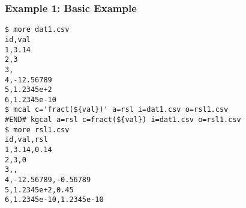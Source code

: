 \subsubsection*{Example 1: Basic Example}



\begin{Verbatim}[baselinestretch=0.7,frame=single]
$ more dat1.csv
id,val
1,3.14
2,3
3,
4,-12.56789
5,1.2345e+2
6,1.2345e-10
$ mcal c='fract(${val})' a=rsl i=dat1.csv o=rsl1.csv
#END# kgcal a=rsl c=fract(${val}) i=dat1.csv o=rsl1.csv
$ more rsl1.csv
id,val,rsl
1,3.14,0.14
2,3,0
3,,
4,-12.56789,-0.56789
5,1.2345e+2,0.45
6,1.2345e-10,1.2345e-10
\end{Verbatim}
